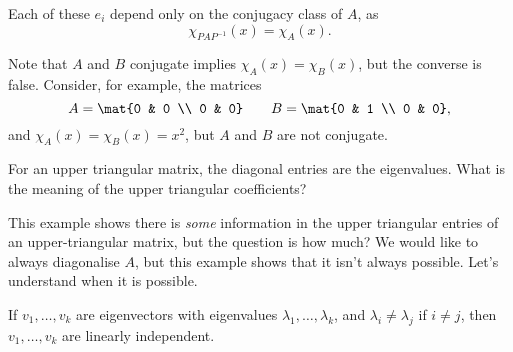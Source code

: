 	Each of these $e_i$ depend only on the conjugacy class of $A$, as
	\begin{equation*}
		\chi_{PAP^{-1}}(x) = \chi_A(x).
	\end{equation*}

\bigskip

Note that $A$ and $B$ conjugate implies $\chi_A(x)=\chi_B(x)$, but the converse is false. Consider, for example, the matrices
\begin{equation*}
	A = \mat{0 & 0 \\ 0 & 0}
	\qquad
	B = \mat{0 & 1 \\ 0 & 0},
\end{equation*}
and $\chi_A(x) = \chi_B(x) =x^2$, but $A$ and $B$ are not conjugate.

For an upper triangular matrix, the diagonal entries are the eigenvalues. What is the meaning of the upper triangular coefficients? 

This example shows there is \emph{some} information in the upper triangular entries of an upper-triangular matrix, but the question is how much? We would like to always diagonalise $A$, but this example shows that it isn't always possible. Let's understand when it is possible. 

% 

\begin{proposition}
	If $v_1,\ldots,v_k$ are eigenvectors with eigenvalues $\lambda_1,\ldots,\lambda_k$, and $\lambda_i\neq \lambda_j$ if $i\neq j$, then $v_1,\ldots,v_k$ are linearly independent.
\end{proposition}

